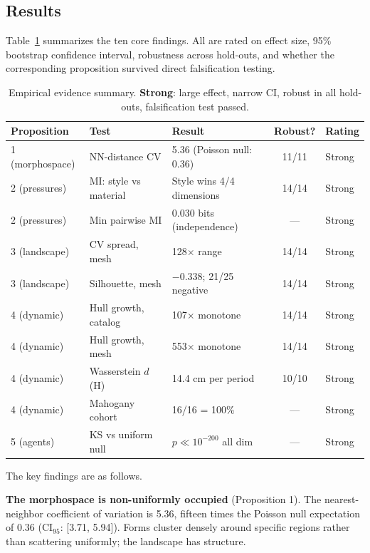 \subsection{Results}

Table~\ref{tab:evidence} summarizes the ten core findings. All are rated on effect size, 95\% bootstrap confidence interval, robustness across hold-outs, and whether the corresponding proposition survived direct falsification testing.

\begin{table}[!t]
\centering
\caption{Empirical evidence summary. \textbf{Strong}: large effect, narrow CI, robust in all hold-outs, falsification test passed.}
\label{tab:evidence}
\small
\begin{tabularx}{\textwidth}{@{} >{\raggedright}p{} >{\raggedright}p{} >{\raggedright}p{} c >{\raggedright\arraybackslash}p{} @{}}
\toprule
\textbf{Proposition} & \textbf{Test} & \textbf{Result} & \textbf{Robust?} & \textbf{Rating} \\
\midrule
1 (morphospace) & NN-distance CV & 5.36 (Poisson null: 0.36) & 11/11 & Strong \\[2pt]
2 (pressures) & MI: style vs material & Style wins 4/4 dimensions & 14/14 & Strong \\[2pt]
2 (pressures) & Min pairwise MI & 0.030 bits (independence) & --- & Strong \\[2pt]
3 (landscape) & CV spread, mesh & 128$\times$ range & 14/14 & Strong \\[2pt]
3 (landscape) & Silhouette, mesh & $-$0.338; 21/25 negative & 14/14 & Strong \\[2pt]
4 (dynamic) & Hull growth, catalog & 107$\times$ monotone & 14/14 & Strong \\[2pt]
4 (dynamic) & Hull growth, mesh & 553$\times$ monotone & 14/14 & Strong \\[2pt]
4 (dynamic) & Wasserstein $d$(H) & 14.4 cm per period & 10/10 & Strong \\[2pt]
4 (dynamic) & Mahogany cohort & 16/16 = 100\% & --- & Strong \\[2pt]
5 (agents) & KS vs uniform null & $p \ll 10^{-200}$ all dim & --- & Strong \\
\bottomrule
\end{tabularx}
\end{table}

The key findings are as follows.

\textbf{The morphospace is non-uniformly occupied} (Proposition 1). The nearest-neighbor coefficient of variation is 5.36, fifteen times the Poisson null expectation of 0.36 ($\mathrm{CI}_{95}$: [3.71, 5.94]). Forms cluster densely around specific regions rather than scattering uniformly; the landscape has structure.

